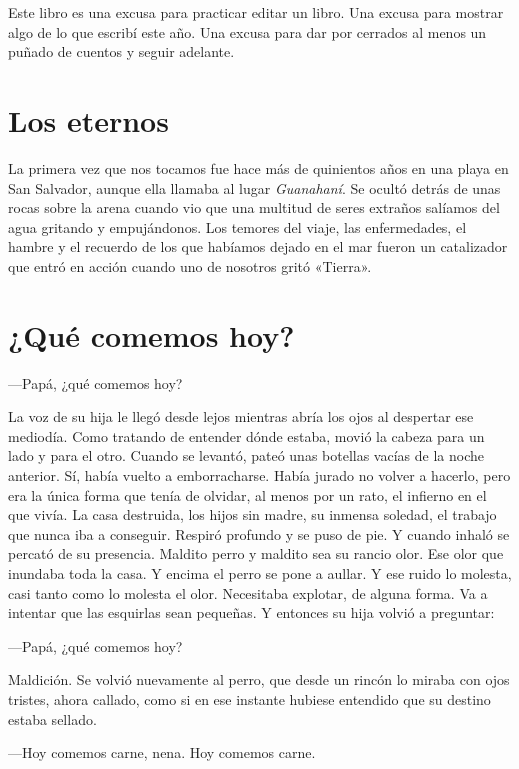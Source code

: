 \documentclass[11pt,twoside,openright,a6paper]{book}
\begin{document}
Este libro es una excusa para practicar editar un libro. Una excusa para mostrar algo de lo que escribí este año. Una excusa para dar por cerra\-dos al menos un puñado de cuentos y seguir adelante.

\chapter*{Los eternos}

La primera vez que nos tocamos fue hace más de quinientos años en una playa en San Salvador, aunque ella llamaba al lugar \emph{Guanahaní}. Se ocultó detrás de unas rocas sobre la arena cuando vio que una multitud de seres extraños salíamos del agua gritando y empujándonos. Los temores del viaje, las enfermedades, el hambre y el recuerdo de los que habíamos dejado en el mar fueron un catalizador que entró en acción cuando uno de nosotros gritó «Tierra».

\chapter*{¿Qué comemos hoy?}

---Papá, ¿qué comemos hoy?

La voz de su hija le llegó desde lejos mientras abría los ojos al despertar ese mediodía. Como tratando de entender dónde estaba, movió la cabeza para un lado y para el otro. Cuando se levantó, pateó unas botellas vacías de la noche anterior. Sí, había vuelto a emborracharse. Había jurado no volver a hacerlo, pero era la única forma que tenía de olvidar, al menos por un rato, el infierno en el que vivía. La casa destruida, los hijos sin madre, su inmensa soledad, el trabajo que nunca iba a conseguir. Respiró profundo y se puso de pie. Y cuando inhaló se percató de su presencia. Maldito perro y maldito sea su rancio olor. Ese olor que inundaba toda la casa. Y encima el perro se pone a aullar. Y ese ruido lo molesta, casi tanto como lo molesta el olor. Necesitaba explotar, de alguna forma. Va a intentar que las esquirlas sean pequeñas.
Y entonces su hija volvió a preguntar:

---Papá, ¿qué comemos hoy?

Maldición. Se volvió nuevamente al perro, que desde un rincón lo miraba con ojos tristes, ahora callado, como si en ese instante hubiese entendido que su destino estaba sellado.

---Hoy comemos carne, nena. Hoy come\-mos carne.
\end{document}
